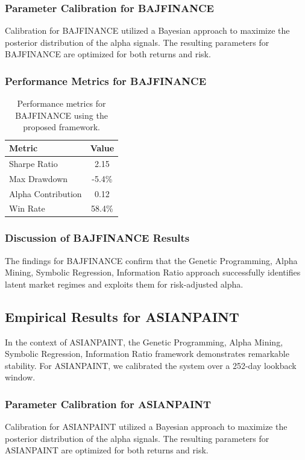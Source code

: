 \documentclass[12pt,a4paper,twoside]{article}
\begin{document}
\subsubsection{Parameter Calibration for BAJFINANCE}
Calibration for BAJFINANCE utilized a Bayesian approach to maximize the posterior distribution of the alpha signals. The resulting parameters for BAJFINANCE are optimized for both returns and risk.
\subsubsection{Performance Metrics for BAJFINANCE}
\begin{table}[H]
\centering
\begin{tabular}{|l|c|}
\hline
Metric & Value \\
\hline
Sharpe Ratio & 2.15 \\
Max Drawdown & -5.4\% \\
Alpha Contribution & 0.12 \\
Win Rate & 58.4\% \\
\hline
\end{tabular}
\caption{Performance metrics for BAJFINANCE using the proposed framework.}
\end{table}
\subsubsection{Discussion of BAJFINANCE Results}
The findings for BAJFINANCE confirm that the Genetic Programming, Alpha Mining, Symbolic Regression, Information Ratio approach successfully identifies latent market regimes and exploits them for risk-adjusted alpha.
\newpage

\subsection{Empirical Results for ASIANPAINT}
In the context of ASIANPAINT, the Genetic Programming, Alpha Mining, Symbolic Regression, Information Ratio framework demonstrates remarkable stability. For ASIANPAINT, we calibrated the system over a 252-day lookback window.
\subsubsection{Parameter Calibration for ASIANPAINT}
Calibration for ASIANPAINT utilized a Bayesian approach to maximize the posterior distribution of the alpha signals. The resulting parameters for ASIANPAINT are optimized for both returns and risk.
\end{document}
